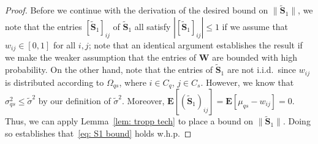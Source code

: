 \documentclass[twoside,11pt]{article}
\renewcommand{\S}{\mathbf{S}}
\newcommand{\E}{\mathbf{E}}
\newcommand{\St}{\bs{\tilde S}}
\newcommand{\bs}{\boldsymbol}
\newcommand{\W}{\bs {W}}
\newcommand{\0}{\bs{0}}
\newcommand{\sbra}[1] {\ensuremath{ \left[ #1\right]}} %
\newcommand{\bra}[1]{\ensuremath{\left\{ #1 \right\}}} %
\begin{document}
{\begin{proof}
Before we continue with the derivation of the desired bound on \(\|\St_1\|\), we note that
the entries $[\St_1]_{ij}$ of $\St_1$ all satisfy $|[\St_1]_{ij}| \leq 1$ if we assume that \(w_{ij} \in [0,1]\)
for all \(i,j\); note that an identical argument establishes the result if we make the weaker assumption that
the entries of \(\W\) are bounded with high probability.
On the other hand, note that the
entries of $\St_1$ are not i.i.d.~since $w_{ij}$ is distributed according to $\Omega_{qs}$, where $i \in C_q$, $j\in C_s$. However, we know that $\sigma^2_{qs} \le \tilde\sigma^2$ by our definition of $\tilde\sigma^2$. Moreover, $\E[{(\St_1)}_{ij}] = \E[\mu_{qs} - w_{ij}] = 0$.
Thus, we can apply Lemma~\ref{lem: tropp tech} to place a bound on $\|\St_1\|$.
Doing so establishes that~\eqref{eq: S1 bound} holds w.h.p.
%

\end{proof}}
\end{document}
